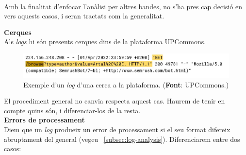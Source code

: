 \noindent \\
Amb la finalitat d'enfocar l'anàlisi per altres bandes, no s'ha pres cap decisió en vers aquests casos, i seran tractats com la generalitat.

\clearpage

\noindent
\textbf{Cerques} \\

\noindent
Als \textit{\gls{log}s} hi són presents cerques dins de la plataforma \gls{UPCommons}. \\

\begin{figure}[htbp]
    \centerline{\includegraphics[width=\textwidth]{figures/log-search}}
    \captionsetup{justification=centering}
    \caption[Exemple d'un \textit{\gls{log}} d'una cerca a la plataforma.]{Exemple d'un \textit{\gls{log}} d'una cerca a la plataforma. (\textbf{Font}: \gls{UPCommons}.)}\label{fig:log-search}
\end{figure}

\noindent
El procediment general no canvia respecta aquest cas.
Haurem de tenir en compte quins són, i diferenciar-los de la resta. \\

\noindent
\textbf{Errors de processament}\label{subsubsection:log-errors} \\

\noindent
Diem que un \textit{\gls{log}} produeix un error de processament si el seu format difereix abruptament del general (vegeu ~\ref{subsec:log-analysis}).
Diferenciarem entre dos casos:

